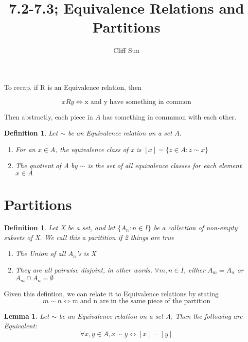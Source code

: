 \documentclass{article}
\title{7.2-7.3; Equivalence Relations and Partitions}
\author{Cliff Sun}
\newtheorem{lemma}[theorem]{Lemma}
\newtheorem{definition}[theorem]{Definition}
\begin{document}
\maketitle

To recap, if R is an Equivalence relation, then 

\begin{equation}
    x R y \iff \textrm{x and y have something in common}
\end{equation}

Then abstractly, each piece in $A$ has something in commmon with each other. 

\begin{definition}
    Let $\sim$ be an Equivalence relation on a set $A$. 
    \begin{enumerate}
        \item For an $x \in A$, the equivalence class of x is $[x] = \{z \in A: z \sim x\}$
        \item The quotient of A by $\sim$ is the set of all equivalence classes for each element $x \in A$
    \end{enumerate}
\end{definition}

\section*{Partitions}

\begin{definition}
    Let X be a set, and let $\{A_n: n \in I\}$ be a collection of non-empty subsets of X.
    We call this a paritition if 2 things are true
    \begin{enumerate}
        \item The Union of all $A_n$'s is X
        \item They are all pairwise disjoint, in other words. $\forall m,n \in I$, either $A_m = A_n$ or $A_m \cap A_n = \emptyset$
    \end{enumerate}
\end{definition}

Given this defintion, we can relate it to Equivalence relations by stating 
\begin{equation}
    m \sim n \iff \textrm{m and n are in the same piece of the partition}
\end{equation}

\begin{lemma}
    Let $\sim$ be an Equivalence relation on a set A, Then the following are Equivalent:
    \begin{equation}
        \forall x,y \in A, x \sim y \iff [x] = [y]
    \end{equation}
\end{lemma}
\end{document}
